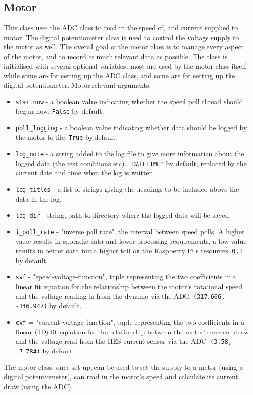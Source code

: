 \documentclass[twoside,a4]{report}
\def\br{\newline \newline \noindent}
\begin{document}
	\subsection*{Motor} %
	This class uses the ADC class to read in the speed of, and current supplied to motor. The digital potentiometer class is used to control the voltage supply to the motor as well. The overall goal of the motor class is to manage every aspect of the motor, and to record as much relevant data as possible. \br
	The class is initialised with several optional variables; most are used by the motor class itself while some are for setting up the ADC class, and some are for setting up the digital potentiometer.\br
	Motor-relevant arguments:
	\begin{itemize}
		\item \texttt{startnow} - a boolean value indicating whether the speed poll thread should begun now. \texttt{False} by default.
		\item \texttt{poll\_logging} - a boolean value indicating whether data should be logged by the motor to file. \texttt{True} by default.
		\item \texttt{log\_note} - a string added to the log file to give more information about the logged data (the test conditions etc). \texttt{"DATETIME"} by default, replaced by the current date and time when the log is written.
		\item \texttt{log\_titles} - a list of strings giving the headings to be included above the data in the log.
		\item \texttt{log\_dir} - string, path to directory where the logged data will be saved.
		\item \texttt{i\_poll\_rate} - "inverse poll rate", the interval between speed polls. A higher value results in sporadic data and lower processing requirements, a low value results in better data but a higher toll on the Raspberry Pi's resources. \texttt{0.1} by default.
		\item \texttt{svf} - "speed-voltage-function", tuple representing the two coefficients in a linear fit equation for the relationship between the motor's rotational speed and the voltage reading in from the dynamo via the ADC. \texttt{(317.666, -146.947)} by default.
		\item \texttt{cvf} = "current-voltage-function", tuple representing the two coefficients in a linear (1D) fit equation for the relationship between the motor's current draw and the voltage read from the HES current sensor via the ADC. \texttt{(3.58, -7.784)} by default.
	\end{itemize}
	The motor class, once set up, can be used to set the supply to a motor (using a digital potentiometer), can read in the motor's speed and calculate its current draw (using the ADC).
	
\end{document}
